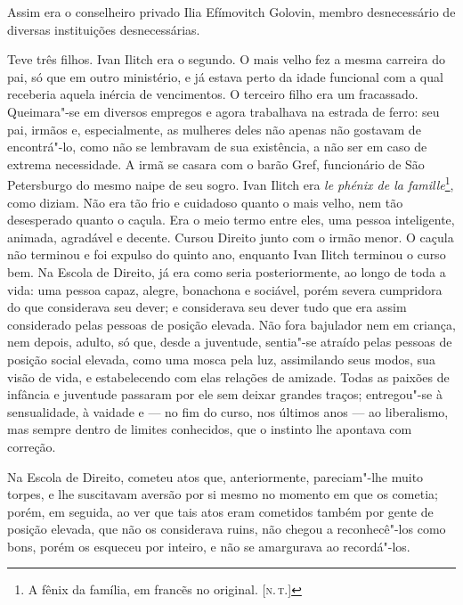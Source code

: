 Assim era o conselheiro privado Ilia Efímovitch Golovin, membro
desnecessário de diversas instituições desnecessárias.

Teve três filhos. Ivan Ilitch era o segundo. O mais velho fez a mesma
carreira do pai, só que em outro ministério, e já estava perto da idade
funcional com a qual receberia aquela inércia de vencimentos. O terceiro
filho era um fracassado. Queimara"-se em diversos empregos e agora
trabalhava na estrada de ferro: seu pai, irmãos e, especialmente, as
mulheres deles não apenas não gostavam de encontrá"-lo, como não se
lembravam de sua existência, a não ser em caso de extrema necessidade. A
irmã se casara com o barão Gref, funcionário de São Petersburgo do mesmo
naipe de seu sogro. Ivan Ilitch era \emph{le phénix de la
famille}\footnote{A fênix da família, em francẽs no original. {[}\textsc{n.\,t.}{]}},
como diziam. Não era tão frio e cuidadoso quanto o mais velho, nem tão
desesperado quanto o caçula. Era o meio termo entre eles, uma pessoa
inteligente, animada, agradável e decente. Cursou Direito junto com o
irmão menor. O caçula não terminou e foi expulso do quinto ano, enquanto
Ivan Ilitch terminou o curso bem. Na Escola de Direito, já era como
seria posteriormente, ao longo de toda a vida: uma pessoa capaz, alegre,
bonachona e sociável, porém severa cumpridora do que considerava seu
dever; e considerava seu dever tudo que era assim considerado pelas
pessoas de posição elevada. Não fora bajulador nem em criança, nem
depois, adulto, só que, desde a juventude, sentia"-se atraído pelas
pessoas de posição social elevada, como uma mosca pela luz, assimilando
seus modos, sua visão de vida, e estabelecendo com elas relações de
amizade. Todas as paixões de infância e juventude passaram por ele sem
deixar grandes traços; entregou"-se à sensualidade, à vaidade e --- no fim
do curso, nos últimos anos --- ao liberalismo, mas sempre dentro de
limites conhecidos, que o instinto lhe apontava com correção.

Na Escola de Direito, cometeu atos que, anteriormente, pareciam"-lhe
muito torpes, e lhe suscitavam aversão por si mesmo no momento em que os
cometia; porém, em seguida, ao ver que tais atos eram cometidos também
por gente de posição elevada, que não os considerava ruins, não chegou a
reconhecê"-los como bons, porém os esqueceu por inteiro, e não se
amargurava ao recordá"-los.

